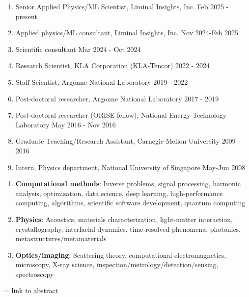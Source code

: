 \documentclass[11pt]{article}
\begin{document}
\begin{enumerate}
    \item Senior Applied Physics/ML Scientist, Liminal Insights, Inc. \hfill Feb 2025 - present
    \item Applied physics/ML consultant, Liminal Insights, Inc. \hfill Nov 2024-Feb 2025
    \item Scientific consultant \hfill Mar 2024 - Oct 2024
    \item Research Scientist, KLA Corporation (KLA-Tencor) \hfill 2022 - 2024
    \item Staff Scientist, Argonne National Laboratory \hfill 2019 - 2022
    \item Post-doctoral researcher, Argonne National Laboratory \hfill 2017 - 2019
    \item Post-doctoral researcher (ORISE fellow), National Energy Technology Laboratory  \hfill May 2016 - Nov 2016
    \item Graduate Teaching/Research Assistant, Carnegie Mellon University \hfill 2009 - 2016
    \item Intern, Physics department, National University of Singapore \hfill May-Jun 2008 
\end{enumerate} 

\begin{enumerate}
    \item \textbf{Computational methods}: Inverse problems, signal processing, harmonic analysis, optimization, data science, deep learning, high-performance computing, algorithms, scientific software development, quantum computing
    \item \textbf{Physics}: Acoustics, materials characterization, light-matter interaction, crystallography, interfacial dynamics, time-resolved phenomena, photonics, metastructures/metamaterials
    \item \textbf{Optics/imaging}: Scattering theory, computational electromagnetics, microscopy, X-ray science, inspection/metrology/detection/sensing, spectroscopy 
\end{enumerate} 

 = link to abstract
\end{document}
